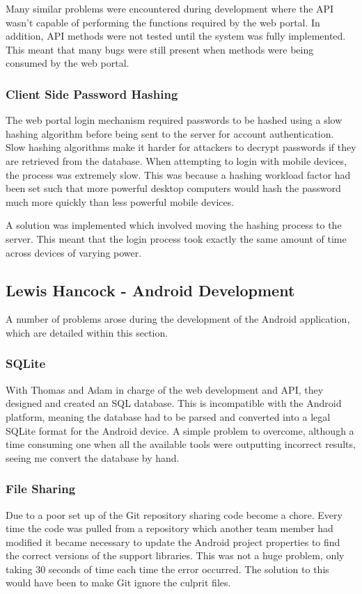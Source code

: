 \documentclass[11pt,a4paper]{report}
\begin{document}
Many similar problems were encountered during development where the API wasn't capable of performing the functions required by the web portal. In addition, API methods were not tested until the system was fully implemented. This meant that many bugs were still present when methods were being consumed by the web portal.

\subsubsection{Client Side Password Hashing}
The web portal login mechanism required passwords to be hashed using a slow hashing algorithm before being sent to the server for account authentication. Slow hashing algorithms make it harder for attackers to decrypt passwords if they are retrieved from the database. When attempting to login with mobile devices, the process was extremely slow. This was because a hashing workload factor had been set such that more powerful desktop computers would hash the password much more quickly than less powerful mobile devices.

A solution was implemented which involved moving the hashing process to the server. This meant that the login process took exactly the same amount of time across devices of varying power.

\subsection{Lewis Hancock - Android Development}
A number of problems arose during the development of the Android application, which are detailed within this section.

\subsubsection{SQLite}
With Thomas and Adam in charge of the web development and API, they designed and created an SQL database. This is incompatible with the Android platform, meaning the database had to be parsed and converted into a legal SQLite format for the Android device. A simple problem to overcome, although a time consuming one when all the available tools were outputting incorrect results, seeing me convert the database by hand.

\subsubsection{File Sharing}
Due to a poor set up of the Git repository sharing code become a chore. Every time the code was pulled from a repository which another team member had modified it became necessary to update the Android project properties to find the correct versions of the support libraries. This was not a huge problem, only taking 30 seconds of time each time the error occurred. The solution to this would have been to make Git ignore the culprit files.
\end{document}
